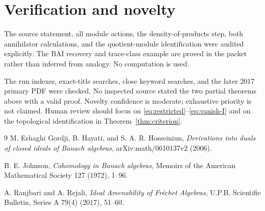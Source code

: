 \documentclass[11pt]{article}
\begin{document}
\section{Verification and novelty}
The source statement, all module actions, the density-of-products step, both
annihilator calculations, and the quotient-module identification were
audited explicitly.  The BAI recovery and trace-class example are proved in
the packet rather than inferred from analogy.  No computation is used.

The run indexes, exact-title searches, close keyword searches, and the later
2017 primary PDF were checked.  No inspected source stated the two partial
theorems above with a valid proof.  Novelty confidence is moderate; exhaustive
priority is not claimed.  Human review should focus on
\eqref{eq:restricted}--\eqref{eq:vanish-I} and on the topological
identification in Theorem~\ref{thm:criterion}.

\begin{thebibliography}{9}
M. Eshaghi Gordji, B. Hayati, and S. A. R. Hosseiniun,
\emph{Derivations into duals of closed ideals of Banach algebras},
arXiv:math/0610137v2 (2006).

B. E. Johnson,
\emph{Cohomology in Banach algebras},
Memoirs of the American Mathematical Society 127 (1972), 1--96.

A. Ranjbari and A. Rejali,
\emph{Ideal Amenability of Fr\'echet Algebras},
U.P.B. Scientific Bulletin, Series A 79(4) (2017), 51--60.
\end{thebibliography}
\end{document}

